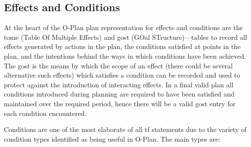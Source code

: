 \subsection{Effects and Conditions}

At the heart of the O-Plan plan representation for effects and conditions
are the {\sc tome} (Table Of Multiple Effects) and {\sc gost} (GOal
STructure)---tables to record all effects generated by actions in
the plan, the conditions satisfied at points in the plan, and the
intentions behind the ways in which conditions have been achieved.  The
{\sc gost} is the means by which the scope of an effect (there could be
several alternative such effects) which satisfies a condition can be
recorded and used to protect against the introduction of interacting
effects.  In a final valid plan all conditions introduced during planning
are required to have been satisfied and maintained over the required
period, hence there will be a valid {\sc gost} entry for each condition
encountered.

Conditions are one of the most elaborate of all {\sc tf} statements due
to the variety of condition types identified as being useful in
O-Plan.  The main types are:

